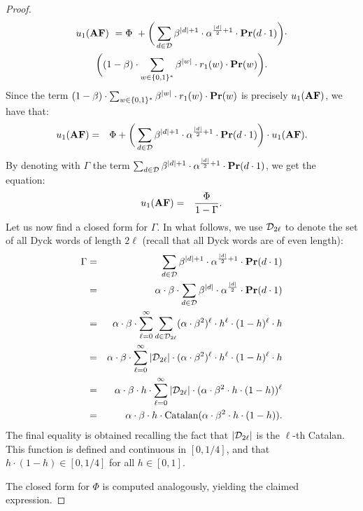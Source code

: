 \begin{proof}
%
\begin{multline*}
 u_1(\text{\rm {\bf AF}}) \ = \Phi  \ +  \bigg(\sum_{d\in \mathcal{D}} \beta^{|d|+1}\cdot  \alpha^{\frac{|d|}{2}+1}\cdot \mathbf{Pr}(d\cdot 1)\bigg) \cdot \\
 \bigg((1-\beta) \cdot \sum_{w\in \{0,1\}^*} \beta^{|w|} \cdot r_1(w)  \cdot \mathbf{Pr}(w)\bigg).
\end{multline*}
%
Since the term $(1-\beta) \cdot \sum_{w\in \{0,1\}^*} \beta^{|w|} \cdot r_1(w)  \cdot \mathbf{Pr}(w)$ is precisely $u_1(\text{\rm {\bf AF}})$, we have that:
%
\begin{eqnarray*}
 u_1(\text{\rm {\bf AF}}) & = & \Phi + 
 \bigg(\sum_{d\in \mathcal{D}} \beta^{|d|+1}\cdot  \alpha^{\frac{|d|}{2}+1}\cdot \mathbf{Pr}(d\cdot 1)\bigg) \cdot  u_1(\text{\rm {\bf AF}}).
\end{eqnarray*}
%
By denoting with $\Gamma$ the term $\sum_{d\in \mathcal{D}} \beta^{|d|+1}\cdot  \alpha^{\frac{|d|}{2}+1}\cdot \mathbf{Pr}(d\cdot 1)$, we get the equation:
\begin{eqnarray*}
u_1(\text{\rm {\bf AF}}) & = &  \frac{\Phi}{1-\Gamma}.
\end{eqnarray*}
Let us now find a closed form for $\Gamma$. In what follows, we use $\mathcal{D}_{2\ell}$ to denote the set of all Dyck words of length $2\ell$ (recall that all Dyck words are of even length):
%
\begin{eqnarray*}
\Gamma & = & \sum_{d\in \mathcal{D}} \beta^{|d|+1}\cdot  \alpha^{\frac{|d|}{2}+1}\cdot \mathbf{Pr}(d\cdot 1)\\
 & = & \alpha\cdot \beta \cdot  \sum_{d\in \mathcal{D}} \beta^{|d|}\cdot  \alpha^{\frac{|d|}{2}}\cdot \mathbf{Pr}(d\cdot 1) \\
  & = & \alpha\cdot \beta \cdot \sum_{\ell = 0}^{\infty} \sum_{d\in \mathcal{D}_{2\ell}} (\alpha\cdot \beta^2)^{\ell}\cdot h^{\ell}\cdot (1-h)^{\ell}\cdot h\\
   & = &  \alpha\cdot \beta \cdot \sum_{\ell = 0}^{\infty} |\mathcal{D}_{2\ell}| \cdot (\alpha\cdot \beta^2)^{\ell}\cdot h^{\ell}\cdot (1-h)^{\ell}\cdot h\\
      & = &  \alpha\cdot \beta \cdot h \cdot \sum_{\ell = 0}^{\infty} |\mathcal{D}_{2\ell}| \cdot (\alpha\cdot \beta^2 \cdot h \cdot (1-h))^{\ell}\\
    & = &  \alpha\cdot \beta \cdot h \cdot \text{\rm Catalan}(\alpha\cdot\beta^2 \cdot h \cdot (1-h)).
\end{eqnarray*}
%
The final equality is obtained recalling the fact that $|\mathcal{D}_{2\ell}|$ is the $\ell$-th Catalan. This function is defined and continuous in $[0,1/4]$, and that $h\cdot(1-h)\in [0,1/4]$ for all $h\in[0,1]$.

The closed form for $\Phi$ is computed analogously, yielding the claimed expression.
\end{proof}



